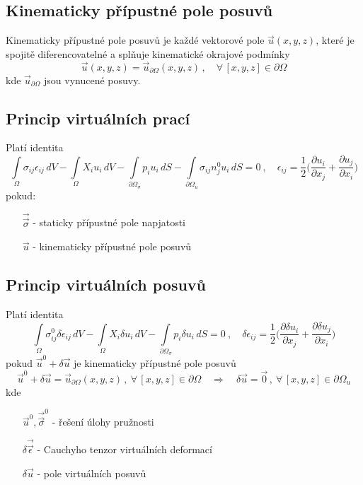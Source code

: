 \documentclass[10pt,oneside]{article}
\newcommand{\tenz}[1]{\vec{\vec{#1}}}
\begin{document}
\subsection*{Kinematicky přípustné pole posuvů}
%
Kinematicky přípustné pole posuvů je každé vektorové pole $\vec{u}(x,y,z)$, které je spojitě diferencovatelné a splňuje kinematické okrajové podmínky
%
\begin{equation*}
\vec{u}(x,y,z) = \vec{u}_{\partial\Omega}(x,y,z) \,,\quad \forall\,[x,y,z] \in \partial\Omega
\end{equation*}
%
kde $\vec{u}_{\partial\Omega}$ jsou vynucené posuvy.

\newpage
\subsection*{Princip virtuálních prací}
%
Platí identita
%
\begin{equation*}
	\int\limits_\Omega \sigma_{ij} \epsilon_{ij} \,dV - \int\limits_\Omega X_i u_i \,dV - \int\limits_{\partial\Omega_\sigma} p_i u_i \,dS - \int\limits_{\partial\Omega_u} \sigma_{ij} n^0_j u_i \,dS = 0
	\ ,\quad
	\epsilon_{ij} = \frac{1}{2} \bigg(\frac{\partial u_i}{\partial x_j} + \frac{\partial u_j}{\partial x_i} \bigg)
\end{equation*}
%
pokud:
\begin{itemize}
\item[$\tenz{\sigma}$] - staticky přípustné pole napjatosti
\item[$\vec{u}$] - kinematicky přípustné pole posuvů
\end{itemize}


\subsection*{Princip virtuálních posuvů}
%
Platí identita
%
\begin{equation*}
	\int\limits_\Omega \sigma_{ij}^0 \delta\epsilon_{ij} \,dV - \int\limits_\Omega X_i \delta u_i \,dV - \int\limits_{\partial\Omega_\sigma} p_i \delta u_i \,dS = 0
	\ ,\quad
	\delta\epsilon_{ij} = \frac{1}{2} \bigg(\frac{\partial \delta u_i}{\partial x_j} + \frac{\partial \delta u_j}{\partial x_i} \bigg)
\end{equation*}
%
pokud $\vec{u}^0 + \delta\vec{u}$ je kinematicky přípustné pole posuvů
%
\begin{equation*}
	\vec{u}^0 + \delta\vec{u} = \vec{u}_{\partial\Omega}(x,y,z) \,,\ \forall\,[x,y,z] \in \partial\Omega
	\quad \Rightarrow \quad
	\delta\vec{u} = \vec{0} \,,\ \forall\,[x,y,z] \in \partial\Omega_u
\end{equation*}
%
kde
%
\begin{itemize}[leftmargin=15mm]
	\item[$\vec{u}^0,\tenz{\sigma}^0$] - řešení úlohy pružnosti
	\item[$\delta\tenz{\epsilon}$] - Cauchyho tenzor virtuálních deformací
	\item[$\delta\vec{u}$] - pole virtuálních posuvů %
\end{itemize}
\end{document}
